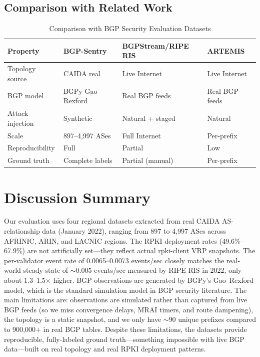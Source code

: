 \documentclass[11pt,a4paper]{article}
\begin{document}
\subsection{Comparison with Related Work}

\begin{table}[H]
\centering
\caption{Comparison with BGP Security Evaluation Datasets}
\begin{tabularx}{\textwidth}{lXXX}
\toprule
\textbf{Property} & \textbf{BGP-Sentry} & \textbf{BGPStream/RIPE RIS} & \textbf{ARTEMIS} \\
\midrule
Topology source   & CAIDA real         & Live Internet    & Live Internet \\
BGP model         & BGPy Gao--Rexford  & Real BGP feeds   & Real BGP feeds \\
Attack injection  & Synthetic          & Natural + staged & Natural \\
Scale             & 897--4,997 ASes    & Full Internet    & Per-prefix \\
Reproducibility   & Full               & Partial          & Low \\
Ground truth      & Complete labels    & Partial (manual) & Per-prefix \\
\bottomrule
\end{tabularx}
\end{table}

\section{Discussion Summary}

Our evaluation uses four regional datasets extracted from real CAIDA AS-relationship data (January 2022), ranging from 897 to 4,997 ASes across AFRINIC, ARIN, and LACNIC regions. The RPKI deployment rates (49.6\%--67.9\%) are not artificially set---they reflect actual rpki-client VRP snapshots. The per-validator event rate of 0.0065--0.0073 events/sec closely matches the real-world steady-state of $\sim$0.005 events/sec measured by RIPE RIS in 2022, only about 1.3--1.5$\times$ higher. BGP observations are generated by BGPy's Gao--Rexford model, which is the standard simulation model in BGP security literature. The main limitations are: observations are simulated rather than captured from live BGP feeds (so we miss convergence delays, MRAI timers, and route dampening), the topology is a static snapshot, and we only have $\sim$90 unique prefixes compared to 900,000+ in real BGP tables. Despite these limitations, the datasets provide reproducible, fully-labeled ground truth---something impossible with live BGP data---built on real topology and real RPKI deployment patterns.
\end{document}
